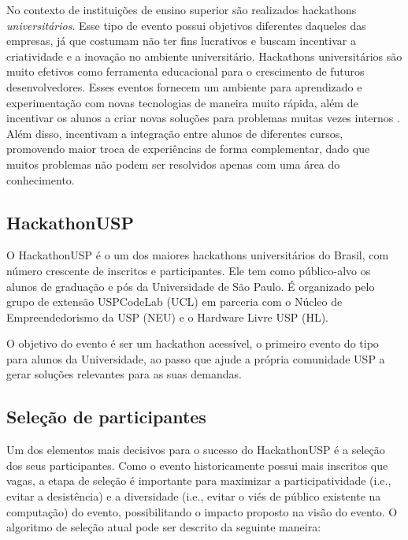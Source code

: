 \documentclass[10pt,twoside,a4paper]{article}
\begin{document}
    No contexto de instituições de ensino superior são realizados hackathons \textit{universitários}. Esse tipo de evento possui objetivos diferentes daqueles das empresas, já que costumam não ter fins lucrativos e buscam incentivar a criatividade e a inovação no ambiente universitário. Hackathons universitários são muito efetivos como ferramenta educacional para o crescimento de futuros desenvolvedores. Esses eventos fornecem um ambiente para aprendizado e experimentação com novas tecnologias de maneira muito rápida, além de incentivar os alunos a criar novas soluções para problemas muitas vezes internos \cite{Kayastha2017EnablingCompetition}. Além disso, incentivam a integração entre alunos de diferentes cursos, promovendo maior troca de experiências de forma complementar, dado que muitos problemas não podem ser resolvidos apenas com uma área do conhecimento.

  \subsection{HackathonUSP}
    
    O HackathonUSP é o um dos maiores hackathons universitários do Brasil, com número crescente de inscritos e participantes. Ele tem como  público-alvo os alunos de graduação e pós da Universidade de São Paulo. É organizado pelo grupo de extensão USPCodeLab (UCL) em parceria com o Núcleo de Empreendedorismo da USP (NEU) e o Hardware Livre USP (HL).
    
    O objetivo do evento é ser um hackathon acessível, o primeiro evento do tipo para alunos da Universidade, ao passo que ajude a própria comunidade USP a gerar soluções relevantes para as suas demandas.
    
\subsection{Seleção de participantes}
    
    Um dos elementos mais decisivos para o sucesso do HackathonUSP é a seleção dos seus participantes. Como o evento historicamente possui mais inscritos que vagas, a etapa de seleção é importante para maximizar a participatividade (i.e., evitar a desistência) e a diversidade (i.e., evitar o viés de público existente na computação) do evento, possibilitando o impacto proposto na visão do evento.
    O algoritmo de seleção atual pode ser descrito da seguinte maneira: \\
    
\end{document}
